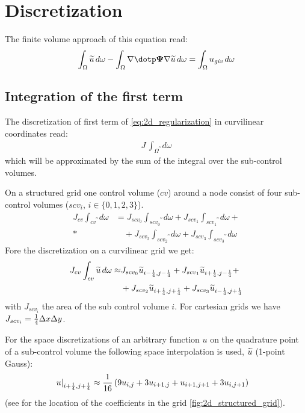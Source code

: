 \section{Discretization} %
The finite volume approach of this equation read:
\begin{align}
    \int_\Omega \widetilde{u}\, d\omega  - \int_\Omega \nabla \dotp \bPsi \nabla \widetilde{u}\, d\omega  = \int_\Omega  u_{\mathit{giv}}\, d\omega \label{eq:2d_regularization}
\end{align}

\subsection{Integration of the first term}
The discretization of first term of \autoref{eq:2d_regularization} in curvilinear coordinates read:
\begin{align}
    J\, \int_{\Omega}  \utilde\, d\omega
\end{align}
which will be approximated by the sum of the integral over the sub-control volumes.

On a structured grid one control volume ($cv$) around a node consist of four sub-control volumes ($scv_i$, $i\in\{0,1,2,3\}$).
\begin{align}
    J_{cv}\int_{cv} \utilde \, d\omega &=
    J_{scv_0}\int_{scv_0} \utilde\, d\omega +
    J_{scv_1}\int_{scv_1} \utilde\, d\omega +
    \nonumber \\*
    &\quad
    +J_{scv_2}\int_{scv_2} \utilde\, d\omega +
    J_{scv_3}\int_{scv_3} \utilde\, d\omega
\end{align}
Fore the discretization on a curvilinear grid we get:
\begin{align}
    J_{cv}\int_{cv}\widetilde{u}\, d\omega \approx &
    J_{scv_0} \widetilde{u}_{i-\frac{1}{4}, j-\frac{1}{4}} +
    J_{scv_1} \widetilde{u}_{i+\frac{1}{4}, j-\frac{1}{4}} +
    \nonumber \\*
    & +
    J_{scv_2} \widetilde{u}_{i+\frac{1}{4}, j+\frac{1}{4}} +
    J_{scv_3} \widetilde{u}_{i-\frac{1}{4}, j+\frac{1}{4}}
\end{align}
with $J_{scv_i}$ the area of the sub control volume $i$.
For cartesian grids we have $J_{scv_i} = \frac{1}{4} \Delta x\Delta y$.

For the space discretizations of an arbitrary function $u$ on the quadrature point of a sub-control volume the following space interpolation is used, $\widetilde{u}$ (1-point Gauss):
\begin{align}
    \left. u\right|_{i+\frac{1}{4}, j+\frac{1}{4}} & \approx \frac{1}{16}\left( 9u_{i, j} + 3 u_{i+1,j} + u_{i+1, j+1} + 3  u_{i, j+1}\right)
\end{align}
(see for the location of the coefficients in the grid \autoref{fig:2d_structured_grid}).
